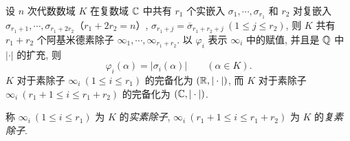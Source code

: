 \begin{theorem}\label{thm:8.20}
\begin{sloppypar}
设 $n$ 次代数数域 $K$ 在复数域 $\mathbb{C}$ 中共有 $r_1$ 个实嵌入 $\sigma_1,\cdots,\sigma_{r_1}$ 和 $r_2$ 对复嵌入 $\sigma_{r_1+1},\cdots,\sigma_{r_1+2r_2}$（$r_1+2r_2=n$）, $\sigma_{r_1+j}=\overline{\sigma}_{r_1+r_2+j}\ (1\leqslant j\leqslant r_2)$, 则 $K$ 共有 $r_1+r_2$ 个阿基米德素除子 $\infty_1,\cdots,\infty_{r_1+r_2}$. 以 $\varphi_i$ 表示 $\infty_i$ 中的赋值, 并且是 $\mathbb{Q}$ 中 $|\cdot|$ 的扩充, 则
\[
  \varphi_i(\alpha)=|\sigma_i(\alpha)|\qquad(\alpha\in K).
\]
$K$ 对于素除子 $\infty_i\ (1\leqslant i\leqslant r_1)$ 的完备化为 $(\mathbb{R},|\cdot|)$, 而 $K$ 对于素除子 $\infty_i\ (r_1+1\leqslant i\leqslant r_1+r_2)$ 的完备化为 $(\mathbb{C},|\cdot|)$.
\end{sloppypar}

称 $\infty_i\ (1\leqslant i\leqslant r_1)$ 为 $K$ 的\emph{实素除子}, $\infty_i\ (r_1+1\leqslant i\leqslant r_1+r_2)$ 为 $K$ 的\emph{复素除子}.
\end{theorem}

